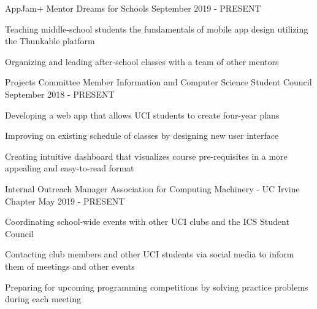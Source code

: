 
\begin{cventries}
  \cventry
  {AppJam+ Mentor}
  {Dreams for Schools}
  {}
  {September 2019 - PRESENT}
  {
	\begin{cvitems}
		\item{Teaching middle-school students the fundamentals of mobile app design utilizing the Thunkable platform}
		\item{Organizing and leading after-school classes with a team of other mentors}
	\end{cvitems}
  }
  

  \cventry
    {Projects Committee Member} %
    {Information and Computer Science Student Council} %
    {} %
    {September 2018 - PRESENT} %
    {
      \begin{cvitems} %
        \item {Developing a web app that allows UCI students to create four-year plans}
        \item {Improving on existing schedule of classes by designing new user interface}
        \item {Creating intuitive dashboard that visualizes course pre-requisites in a more appealing and easy-to-read format}
      \end{cvitems}
    }
    
  \cventry
    {Internal Outreach Manager} %
    {Association for Computing Machinery - UC Irvine Chapter} %
    {} %
    {May 2019 - PRESENT} %
    {
      \begin{cvitems}
      	\item {Coordinating school-wide events with other UCI clubs and the ICS Student Council}
        \item {Contacting club members and other UCI students via social media to inform them of meetings and other events}
        \item {Preparing for upcoming programming competitions by solving practice problems during each meeting}
      \end{cvitems}
    }
    
\end{cventries}
